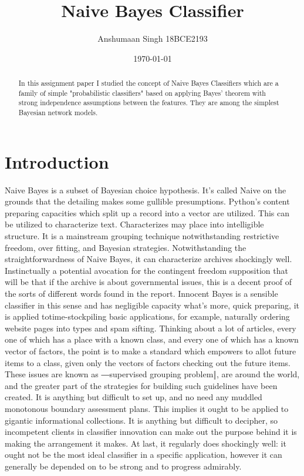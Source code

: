 \documentclass[letterpaper,12pt]{article}
\begin{document}
\title{Naive Bayes Classifier}
\author{Anshumaan Singh 18BCE2193}
\date{\today}
\maketitle

\begin{abstract}
In this assignment paper I studied the concept of Naive Bayes Classifiers which are a family of simple "probabilistic classifiers" based on applying Bayes' theorem with strong independence assumptions between the features. They are among the simplest Bayesian network models.   
\end{abstract}


\section{Introduction}

Naive Bayes is a subset of Bayesian choice hypothesis. It's called Naive on the grounds that the detailing makes some gullible 
presumptions. Python's content preparing capacities which split up a record into a vector are utilized. This can be utilized to characterize text. Characterizes may place into intelligible structure. It is a mainstream grouping technique notwithstanding restrictive freedom, over fitting, and Bayesian strategies. 
Notwithstanding the straightforwardness of Naive Bayes, it can characterize archives shockingly well. Instinctually a potential 
avocation for the contingent freedom supposition that will be that if the archive is about governmental issues, this is a decent proof of the sorts of different words found in the report. Innocent Bayes is a sensible classifier in this sense and has negligible capacity 
what's more, quick preparing, it is applied totime-stockpiling basic applications, for example, naturally ordering website pages into types and spam sifting. Thinking about a lot of articles, every one of which has a place with a known class, and every one of which has a known vector of factors, the point is to make a standard which empowers to allot future items to a class, given only the vectors of factors checking out the future items. These issues are known as ―supervised grouping problem‖, are around the world, and the greater part of the strategies for building such guidelines have been created. It is anything but difficult to set up, and no need any muddled monotonous boundary assessment plans. This implies it ought to be applied to gigantic informational collections. It is anything but difficult to decipher, so incompetent clients in 
classifier innovation can make out the purpose behind it is making the arrangement it makes. At last, it regularly does shockingly 
well: it ought not be the most ideal classifier in a specific application, however it can generally be depended on to be strong and to progress admirably.
\end{document}
